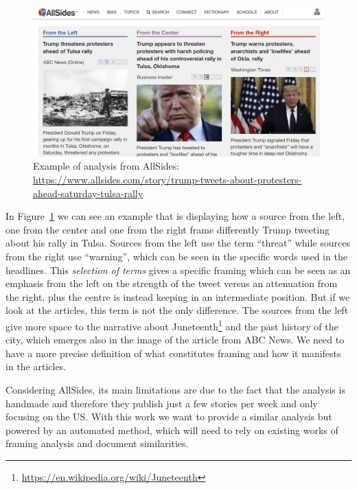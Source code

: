 \begin{figure}[!htb]
    \centering
    \includegraphics[width=\linewidth]{figures/allsides.png}
    \caption{Example of analysis from AllSides: \url{https://www.allsides.com/story/trump-tweets-about-protesters-ahead-saturday-tulsa-rally}}
    \label{fig:allsides}
\end{figure}

In Figure~\ref{fig:allsides} we can see an example that is displaying how a source from the left, one from the center and one from the right frame differently Trump tweeting about his rally in Tulsa.
Sources from the left use the term ``threat'' while sources from the right use ``warning'', which can be seen in the specific words used in the headlines.
This \emph{selection of terms} gives a specific framing which can be seen as an emphasis from the left on the strength of the tweet versus an attenuation from the right, plus the centre is instead keeping in an intermediate position.
But if we look at the articles, this term is not the only difference. The sources from the left give more space to the narrative about Juneteenth\footnote{\url{https://en.wikipedia.org/wiki/Juneteenth}} and the past history of the city, which emerges also in the image of the article from ABC News.
We need to have a more precise definition of what constitutes framing and how it manifests in the articles.

Considering AllSides, its main limitations are due to the fact that the analysis is handmade and therefore they publish just a few stories per week and only focusing on the US.
With this work we want to provide a similar analysis but powered by an automated method, which will need to rely on existing works of framing analysis and document similarities.

